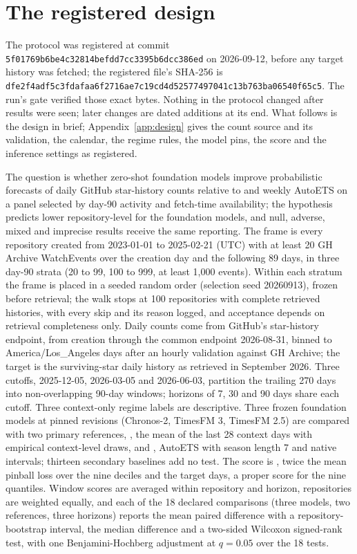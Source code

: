 \section{The registered design}

The protocol was registered at commit \texttt{5f01769b6be4c32814befdd7cc3395b6dcc386ed} on 2026-09-12,
before any target history was fetched; the registered file's SHA-256 is
\texttt{dfe2f4adf5c3fdafaa6f2716ae7c19cd4d52577497041c13b763ba06540f65c5}. The run's gate verified those
exact bytes. Nothing in the protocol changed after results were seen; later changes are dated additions at its
end. What follows is the design in brief; Appendix~\ref{app:design} gives the count source and its
validation, the calendar, the regime rules, the model pins, the score and the inference settings as
registered.

The question is whether zero-shot foundation models improve probabilistic forecasts of daily GitHub
star-history counts relative to \lm{} and weekly AutoETS on a panel selected by day-90 activity and
fetch-time availability; the hypothesis predicts lower repository-level \qs{} for the foundation models, and
null, adverse, mixed and imprecise results receive the same reporting. The frame is every repository created
from 2023-01-01 to 2025-02-21 (UTC) with at least 20 GH Archive WatchEvents over the creation day and the
following 89 days, in three day-90 strata (20 to 99, 100 to 999, at least 1,000 events). Within each stratum
the frame is placed in a seeded random order (selection seed 20260913), frozen before retrieval; the walk
stops at 100 repositories with complete retrieved histories, with every skip and its reason logged, and
acceptance depends on retrieval completeness only. Daily counts come from GitHub's star-history endpoint,
from creation through the common endpoint 2026-08-31, binned to America/Los\_Angeles days after an hourly
validation against GH Archive; the target is the surviving-star daily history as retrieved in September
2026. Three cutoffs, 2025-12-05, 2026-03-05 and 2026-06-03, partition the trailing 270 days into
non-overlapping 90-day windows; horizons of 7, 30 and 90 days share each cutoff. Three context-only regime
labels are descriptive. Three frozen foundation models at pinned revisions (Chronos-2, TimesFM 3, TimesFM
2.5) are compared with two primary references, \lm{}, the mean of the last 28 context days with empirical
context-level draws, and \aets{}, AutoETS with season length 7 and native intervals; thirteen secondary
baselines add no test. The score is \qs{}, twice the mean pinball loss over the nine deciles and the target
days, a proper score for the nine quantiles. Window scores are averaged within repository and horizon,
repositories are weighted equally, and each of the 18 declared comparisons (three models, two references,
three horizons) reports the mean paired difference with a repository-bootstrap interval, the median
difference and a two-sided Wilcoxon signed-rank test, with one Benjamini-Hochberg adjustment at $q = 0.05$
over the 18 tests.
